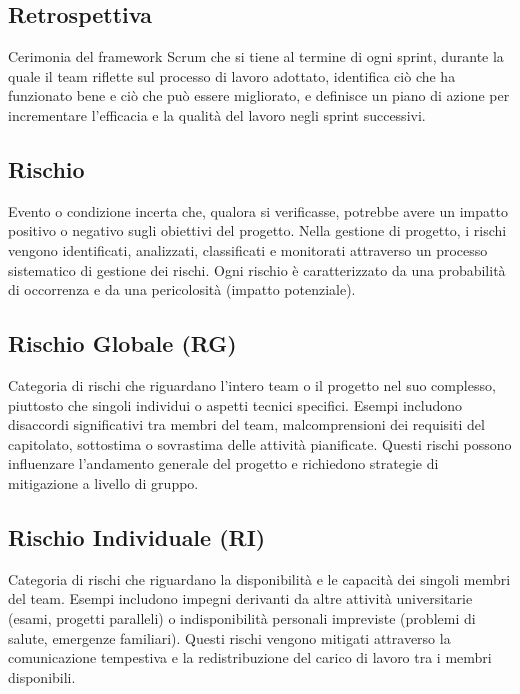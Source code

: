 \documentclass[a4paper,11pt]{article}
\begin{document}
\subsection{Retrospettiva}
Cerimonia del framework Scrum che si tiene al termine di ogni sprint, durante la quale il team riflette sul processo di lavoro adottato, identifica ciò che ha funzionato bene e ciò che può essere migliorato, e definisce un piano di azione per incrementare l'efficacia e la qualità del lavoro negli sprint successivi.









\subsection{Rischio}
Evento o condizione incerta che, qualora si verificasse, potrebbe avere un impatto positivo o negativo sugli obiettivi del progetto. Nella gestione di progetto, i rischi vengono identificati, analizzati, classificati e monitorati attraverso un processo sistematico di gestione dei rischi. Ogni rischio è caratterizzato da una probabilità di occorrenza e da una pericolosità (impatto potenziale).









\subsection{Rischio Globale (RG)}
Categoria di rischi che riguardano l'intero team o il progetto nel suo complesso, piuttosto che singoli individui o aspetti tecnici specifici. Esempi includono disaccordi significativi tra membri del team, malcomprensioni dei requisiti del capitolato, sottostima o sovrastima delle attività pianificate. Questi rischi possono influenzare l'andamento generale del progetto e richiedono strategie di mitigazione a livello di gruppo.









\subsection{Rischio Individuale (RI)}
Categoria di rischi che riguardano la disponibilità e le capacità dei singoli membri del team. Esempi includono impegni derivanti da altre attività universitarie (esami, progetti paralleli) o indisponibilità personali impreviste (problemi di salute, emergenze familiari). Questi rischi vengono mitigati attraverso la comunicazione tempestiva e la redistribuzione del carico di lavoro tra i membri disponibili.
\end{document}
